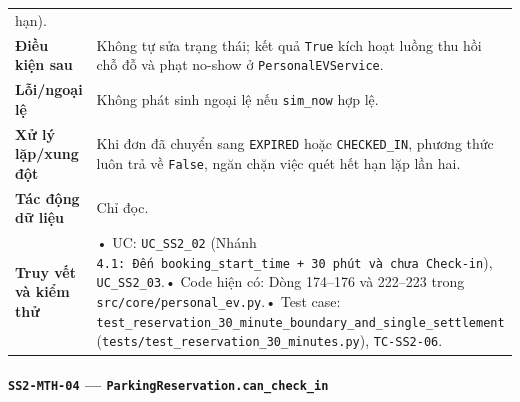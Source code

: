 \documentclass[11pt,a4paper]{article}
\begin{document}
\begin{longtable}[]{@{}
  >{\raggedright\arraybackslash}p{}
  >{\raggedright\arraybackslash}p{}@{}}
hạn). \\
\textbf{Điều kiện sau} & Không tự sửa trạng thái; kết quả \texttt{True}
kích hoạt luồng thu hồi chỗ đỗ và phạt no-show ở
\texttt{PersonalEVService}. \\
\textbf{Lỗi/ngoại lệ} & Không phát sinh ngoại lệ nếu \texttt{sim\_now}
hợp lệ. \\
\textbf{Xử lý lặp/xung đột} & Khi đơn đã chuyển sang \texttt{EXPIRED}
hoặc \texttt{CHECKED\_IN}, phương thức luôn trả về \texttt{False}, ngăn
chặn việc quét hết hạn lặp lần hai. \\
\textbf{Tác động dữ liệu} & Chỉ đọc. \\
\textbf{Truy vết và kiểm thử} & • UC: \texttt{UC\_SS2\_02} (Nhánh
\texttt{4.1:\ Đến\ booking\_start\_time\ +\ 30\ phút\ và\ chưa\ Check-in}),
\texttt{UC\_SS2\_03}.• Code hiện có: Dòng 174--176 và 222--223 trong
\texttt{src/core/personal\_ev.py}.• Test case:
\texttt{test\_reservation\_30\_minute\_boundary\_and\_single\_settlement}
(\texttt{tests/test\_reservation\_30\_minutes.py}),
\texttt{TC-SS2-06}. \\
\end{longtable}

\hypertarget{ss2-mth-04-parkingreservation.can_check_in}{%
\paragraph{\texorpdfstring{\texttt{SS2-MTH-04} ---
\texttt{ParkingReservation.can\_check\_in}}{SS2-MTH-04 --- ParkingReservation.can\_check\_in}}\label{ss2-mth-04-parkingreservation.can_check_in}}
\end{document}

